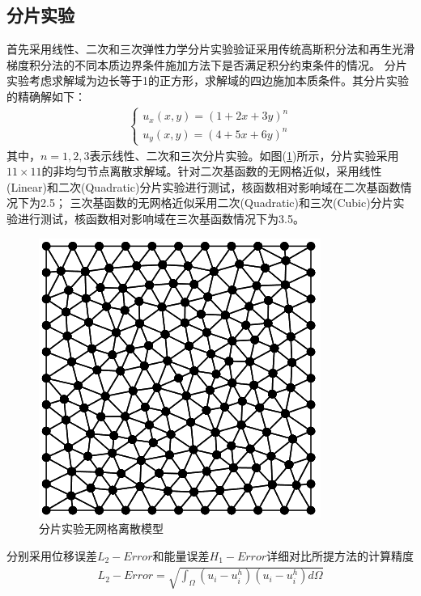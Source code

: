 \subsection{分片实验}
首先采用线性、二次和三次弹性力学分片实验验证采用传统高斯积分法和再生光滑梯度积分法的不同本质边界条件施加方法下是否满足积分约束条件的情况。
分片实验考虑求解域为边长等于1的正方形，求解域的四边施加本质条件。其分片实验的精确解如下：
\begin{equation}
\begin{split}
    \begin{cases}
        u_x(x,y)=(1+2x+3y)^n\\
        u_y(x,y)=(4+5x+6y)^n
    \end{cases}
\end{split}
\end{equation}
其中，$n=1,2,3$表示线性、二次和三次分片实验。如图(\ref{patchtestmeshfree})所示，分片实验采用$11\times 11$的非均匀节点离散求解域。针对二次基函数的无网格近似，采用线性(Linear)和二次(Quadratic)分片实验进行测试，核函数相对影响域在二次基函数情况下为2.5；
三次基函数的无网格近似采用二次(Quadratic)和三次(Cubic)分片实验进行测试，核函数相对影响域在三次基函数情况下为3.5。\par
\begin{figure}[!h]
    \centering
    \includegraphics[scale=0.7]{figure/patchtestmeshfree.png}
    \caption{分片实验无网格离散模型}\label{patchtestmeshfree}
\end{figure}\par
分别采用位移误差$L_2-Error$和能量误差$H_1-Error$详细对比所提方法的计算精度
\begin{equation}
\begin{split}
    L_2-Error=\sqrt{\int_{\Omega}(u_i-u_i^h)(u_i-u_i^h)d\Omega}
\end{split}
\end{equation}
